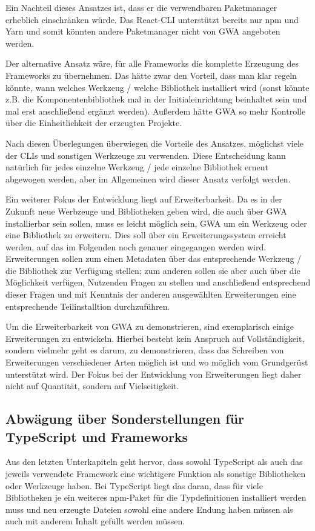 Ein Nachteil dieses Ansatzes ist, dass er die verwendbaren Paketmanager erheblich einschränken würde. Das React-\gls{CLI} unterstützt bereits nur \gls{npm} und Yarn \cite{cra_package_managers} und somit könnten andere Paketmanager nicht von \gls{GWA} angeboten werden.

Der alternative Ansatz wäre, für alle Frameworks die komplette Erzeugung des Frameworks zu übernehmen. Das hätte zwar den Vorteil, dass man klar regeln könnte, wann welches Werkzeug / welche Bibliothek installiert wird (sonst könnte z.B. die Komponentenbibliothek mal in der Initialeinrichtung beinhaltet sein und mal erst anschließend ergänzt werden). Außerdem hätte \gls{GWA} so mehr Kontrolle über die Einheitlichkeit der erzeugten Projekte.

Nach diesen Überlegungen überwiegen die Vorteile des Ansatzes, möglichst viele der \gls{CLI}s und sonstigen Werkzeuge zu verwenden. Diese Entscheidung kann natürlich für jedes einzelne Werkzeug / jede einzelne Bibliothek erneut abgewogen werden, aber im Allgemeinen wird dieser Ansatz verfolgt werden.

Ein weiterer Fokus der Entwicklung liegt auf Erweiterbarkeit. Da es in der Zukunft neue Werbzeuge und Bibliotheken geben wird, die auch über \gls{GWA} installierbar sein sollen, muss es leicht möglich sein, \gls{GWA} um ein Werkzeug oder eine Bibliothek zu erweitern. Dies soll über ein Erweiterungssystem erreicht werden, auf das im Folgenden noch genauer eingegangen werden wird. Erweiterungen sollen zum einen Metadaten über das entsprechende Werkzeug / die Bibliothek zur Verfügung stellen; zum anderen sollen sie aber auch über die Möglichkeit verfügen, Nutzenden Fragen zu stellen und anschließend entsprechend dieser Fragen und mit Kenntnis der anderen ausgewählten Erweiterungen eine entsprechende Teilinstalltion durchzuführen.

Um die Erweiterbarkeit von \gls{GWA} zu demonstrieren, sind exemplarisch einige Erweiterungen zu entwickeln. Hierbei besteht kein Anspruch auf Vollständigkeit, sondern vielmehr geht es darum, zu demonstrieren, dass das Schreiben von Erweiterungen verschiedener Arten möglich ist und wo möglich vom Grundgerüst unterstützt wird. Der Fokus bei der Entwicklung von Erweiterungen liegt daher nicht auf Quantität, sondern auf Vielseitigkeit.

\subsection{Abwägung über Sonderstellungen für TypeScript und Frameworks}
Aus den letzten Unterkapiteln geht hervor, dass sowohl TypeScript als auch das jeweils verwendete Framework eine wichtigere Funktion als sonstige Bibliotheken oder Werkzeuge haben. Bei TypeScript liegt das daran, dass für viele Bibliotheken je ein weiteres \gls{npm}-Paket für die Typdefinitionen installiert werden muss und neu erzeugte Dateien sowohl eine andere Endung haben müssen als auch mit anderem Inhalt gefüllt werden müssen.

